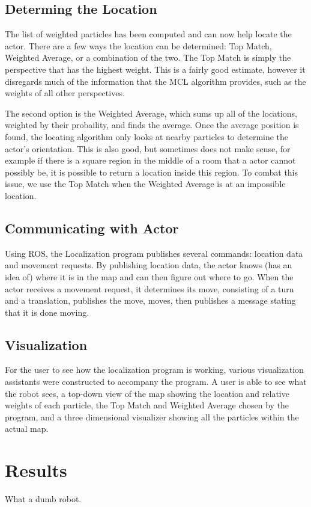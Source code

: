 \documentclass[a4paper,11pt]{article}
\begin{document}
\subsection{Determing the Location}
The list of weighted particles has been computed and can now help locate the actor. There are a few ways the location can be determined: Top Match, Weighted Average, or a combination of the two. The Top Match is simply the perspective that has the highest weight. This is a fairly good estimate, however it disregards much of the information that the MCL algorithm provides, such as the weights of all other perspectives. 

The second option is the Weighted Average, which sums up all of the locations, weighted by their probaility, and finds the average. Once the average position is found, the locating algorithm only looks at nearby particles to determine the actor's orientation. This is also good, but sometimes does not make sense, for example if there is a square region in the middle of a room that a actor cannot possibly be, it is possible to return a location inside this region. To combat this issue, we use the Top Match when the Weighted Average is at an impossible location.

\subsection{Communicating with Actor}
Using ROS, the Localization program publishes several commands: location data and movement requests. By publishing location data, the actor knows (has an idea of) where it is in the map and can then figure out where to go. When the actor receives a movement request, it determines its move, consisting of a turn and a translation, publishes the move, moves, then publishes a message stating that it is done moving.

\subsection{Visualization}
For the user to see how the localization program is working, various visualization assistants were constructed to accompany the program. A user is able to see what the robot sees, a top-down view of the map showing the location and relative weights of each particle, the Top Match and Weighted Average chosen by the program, and a three dimensional visualizer showing all the particles within the actual map.

\section{Results}
What a dumb robot.
\end{document}
